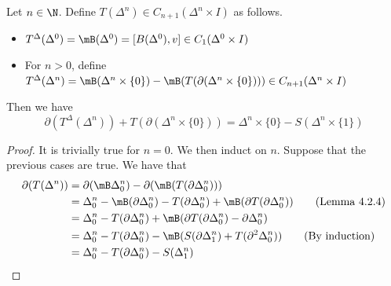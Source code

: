 \documentclass[a4paper]{article}
\begin{document}
\begin{prp}{}{} Let $n\in\N$. Define $T(\Delta^n)\in C_{n+1}(\Delta^n\times I)$ as follows. 
\begin{itemize}
\item $T^\Delta(\Delta^0)=\mB(\Delta^0)=[B(\Delta^0),v]\in C_1(\Delta^0\times I)$
\item For $n>0$, define $T^\Delta(\Delta^n)=\mB(\Delta^n\times\{0\})-\mB(T(\partial(\Delta^n\times\{0\})))\in C_{n+1}(\Delta^n\times I)$
\end{itemize}
Then we have $$\partial(T^\Delta(\Delta^n))+T(\partial(\Delta^n\times\{0\}))=\Delta^n\times\{0\}-S(\Delta^n\times\{1\})$$ 
\begin{proof}
It is trivially true for $n=0$. We then induct on $n$. Suppose that the previous cases are true. We have that 
\begin{align*}
\partial(T(\Delta^n))&=\partial(\mB\Delta_0^n)-\partial(\mB(T(\partial\Delta_0^n)))\\
&=\Delta_0^n-\mB(\partial\Delta_0^n)-T(\partial\Delta_0^n)+\mB(\partial T(\partial\Delta_0^n))\tag{Lemma 4.2.4}\\
&=\Delta_0^n-T(\partial\Delta_0^n)+\mB(\partial T(\partial\Delta_0^n)-\partial\Delta_0^n)\\
&=\Delta_0^n-T(\partial\Delta_0^n)-\mB(S(\partial\Delta_1^n)+T(\partial^2\Delta_0^n))\tag{By induction}\\
&=\Delta_0^n-T(\partial\Delta_0^n)-S(\Delta_1^n)
\end{align*}
\end{proof}
\end{prp}
\end{document}
